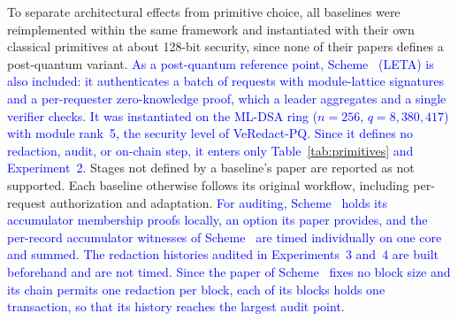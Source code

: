 \documentclass[lettersize,journal]{IEEEtran}
\newcommand{\chg}[1]{\textcolor{blue}{#1}}
\begin{document}
    To separate architectural effects from primitive choice, all baselines were reimplemented within the same framework and
    instantiated with their own classical primitives at about 128-bit
    security, since none of their papers defines a post-quantum variant.
    \chg{As a post-quantum reference point, Scheme~\cite{ref39} (LETA) is
    also included: it authenticates a batch of requests with module-lattice
    signatures and a per-requester zero-knowledge proof, which a leader
    aggregates and a single verifier checks. It was instantiated on the
    ML-DSA ring ($n=256$, $q=8{,}380{,}417$) with module rank~5, the security
    level of VeRedact-PQ. Since it defines no redaction, audit, or on-chain
    step, it enters only Table~\ref{tab:primitives} and Experiment~2.}
    Stages not
    defined by a baseline's paper are reported as not supported. Each baseline otherwise follows its original
    workflow, including per-request authorization and adaptation.
    \chg{For auditing, Scheme~\cite{ref1} holds its accumulator membership
    proofs locally, an option its paper provides, and the per-record
    accumulator witnesses of Scheme~\cite{ref13} are timed individually on one
    core and summed. The redaction histories audited in Experiments~3 and~4
    are built beforehand and are not timed. Since the paper of
    Scheme~\cite{ref1} fixes no block size and its chain permits one
    redaction per block, each of its blocks holds one transaction, so that
    its history reaches the largest audit point.}
\end{document}
